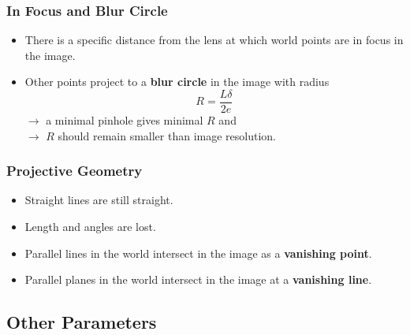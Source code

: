 \documentclass[a4paper,12 pt]{article}
\theoremstyle{definition}
\theoremstyle{remark}
\theoremstyle{definition}
\theoremstyle{definition}
\theoremstyle{definition}
\theoremstyle{remark}
\theoremstyle{definition}
\begin{document}
\subsubsection*{In Focus and Blur Circle}
\begin{itemize}
\item There is a specific distance from the lens at which world points are in focus in the image.
\item Other points project to a \textbf{blur circle} in the image with radius
\begin{equation}
R=\frac{L\delta }{2e}
\end{equation}
$\rightarrow$ a minimal pinhole gives minimal $R$ and\\
$\rightarrow$ $R$ should remain smaller than image resolution.
\end{itemize}
\subsubsection*{Projective Geometry}
\begin{itemize}
\item Straight lines are still straight.
\item Length and angles are lost.
\item Parallel lines in the world intersect in the image as a \textbf{vanishing point}.
\item Parallel planes in the world intersect in the image at a \textbf{vanishing line}. 
\end{itemize}
\subsection*{Other Parameters}
\end{document}
